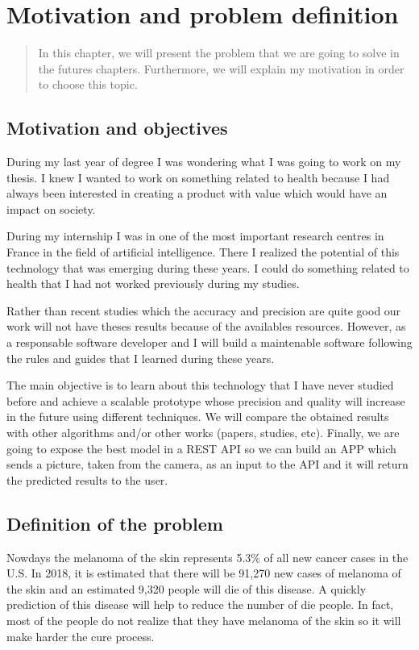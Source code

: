 \chapter{Motivation and problem definition}

\begin{abstract}
In this chapter, we will present the problem that we are going to solve in the futures chapters. Furthermore, we will explain my motivation in order to choose this topic. 
\end{abstract}

\section{Motivation and objectives}

During my last year of degree I was wondering what I was going to work on my thesis. I knew I wanted to work on something related to health because I had always been interested in creating a product with value which would have an impact on society.

During my internship I was in one of the most important research centres in France in the field of artificial intelligence. There I realized the potential of this technology that was emerging during these years. I could do something related to health that I had not worked previously during my studies.

Rather than recent studies which the accuracy and precision are quite good our work will not have theses results because of the availables resources. However, as a responsable software developer and I will build a maintenable software following the rules and guides that I learned during these years. 

The main objective is to learn about this technology that I have never studied before and achieve a scalable prototype whose precision and quality will increase in the future using different techniques. We will compare the obtained results with other algorithms and/or other works (papers, studies, etc). Finally, we are going to expose the best model in a REST API so we can build an APP which sends a picture, taken from the camera, as an input to the API and it will return the predicted results to the user.


\section{Definition of the problem}
Nowdays the melanoma of the skin represents 5.3\% of all new cancer cases in the U.S. In 2018, it is estimated that there will be 91,270 new cases of melanoma of the skin and an estimated 9,320 people will die of this disease.\cite{melanoma-stadistics} A quickly prediction of this disease will help to reduce the number of die people. In fact, most of the people do not realize that they have melanoma of the skin so it will make harder the cure process. 

